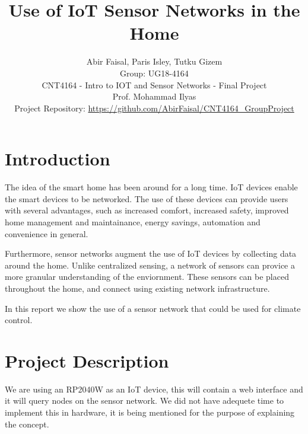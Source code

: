\documentclass[10pt, journal]{IEEEtran} %
\title{
    Use of IoT Sensor Networks in the Home \\
    }
\author{
    Abir Faisal, Paris Isley, Tutku Gizem \\
    \small Group: UG18-4164 \\
    \small CNT4164 - Intro to IOT and Sensor Networks - Final Project \\
    \small Prof. Mohammad Ilyas \\
    \smallskip
    \small Project Repository: \url{https://github.com/AbirFaisal/CNT4164_GroupProject}
    }
\begin{document}

\section{Introduction}

The idea of the smart home has been around for a long time.
IoT devices enable the smart devices to be networked.
The use of these devices can provide users with several advantages,
such as increased comfort, increased safety, improved home management and maintainance,
energy savings, automation and convenience in general.

Furthermore, sensor networks augment the use of IoT devices by collecting data around the home.
Unlike centralized sensing, a network of sensors can provice a more granular understanding of the enviornment.
These sensors can be placed throughout the home, and connect using existing network infrastructure.

In this report we show the use of a sensor network that could be used for climate control.

\section{Project Description}

We are using an RP2040W as an IoT device, this will contain a web interface and it will
query nodes on the sensor network.
We did not have adequete time to implement this in hardware,
it is being mentioned for the purpose of explaining the concept.
\end{document}
